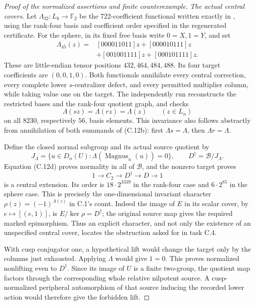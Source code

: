 \begin{proof}[Proof of the normalized assertions and finite counterexample]
\emph{The actual central covers.}
Let \(\Lambda_{32}:L_8\to\mathbb F_2\) be the
722-coefficient functional written exactly in
, using the
rank-four basis and coefficient order specified
in the regenerated certificate. For the sphere,
in its fixed free basis write \(0=X,1=Y\), and set
\[
 \begin{split}
 \Lambda_{45}(z)={}&[000011011]z+[000010111]z\\
                  &+[001001111]z+[000101111]z.
 \end{split}
 \tag{C.12c}
\]
These are little-endian tensor positions
\(432,464,484,488\). Its four target coefficients
are \((0,0,1,0)\).
Both functionals annihilate every central correction,
every complete lower \(s\)-centralizer defect,
and every permitted multiplier column, while taking
value one on the target. The independently run
 reconstructs the
restricted bases and the rank-four quotient graph,
and checks
\[
 \Lambda(sz)=\Lambda(rz)=\Lambda(z)\qquad(z\in L_n)
 \tag{C.12d}
\]
on all \(8230\), respectively \(56\), basis elements.
This invariance also follows abstractly from
annihilation of both summands of (C.12b): first
\(\Lambda s=\Lambda\), then \(\Lambda r=\Lambda\).

Define the closed normal subgroup and its actual
source quotient by
\[
 J_\Lambda=\{u\in D_n(U):
               \Lambda(\operatorname{Magnus}_n(u))=0\},\qquad
 D^\dagger=\mathcal B/J_\Lambda.
 \tag{C.12e}
\]
Equation (C.12d) proves normality in all of
\(\mathcal B\), and the nonzero target proves
\[
 1\longrightarrow C_2\longrightarrow D^\dagger
       \longrightarrow D\longrightarrow1
 \tag{C.12f}
\]
is a central extension. Its order is
\(18\cdot2^{3339}\) in the rank-four case and
\(6\cdot2^{85}\) in the sphere case.
This is precisely the one-dimensional invariant
character \(\rho(z)=(-1)^{\Lambda(z)}\) in C.1's
count. Indeed the image of \(E\) in its scalar
cover, by \(e\mapsto[(e,1)]\), is
\(E/\ker\rho=D^\dagger\); the original source
map gives the required marked epimorphism.
Thus an explicit character, and not only the
existence of an unspecified central cover, locates
the obstruction asked for in task C.4.

With cusp conjugator one, a hypothetical lift
would change the target only by the columns just
exhausted. Applying \(\Lambda\) would give
\(1=0\). This proves normalized nonlifting even
to \(D^\dagger\). Since its image of \(U\) is a
finite two-group, the quotient map factors through
the corresponding whole relative nilpotent source.
A cusp-normalized peripheral automorphism of that
source inducing the recorded lower action would
therefore give the forbidden lift.


\end{proof}
